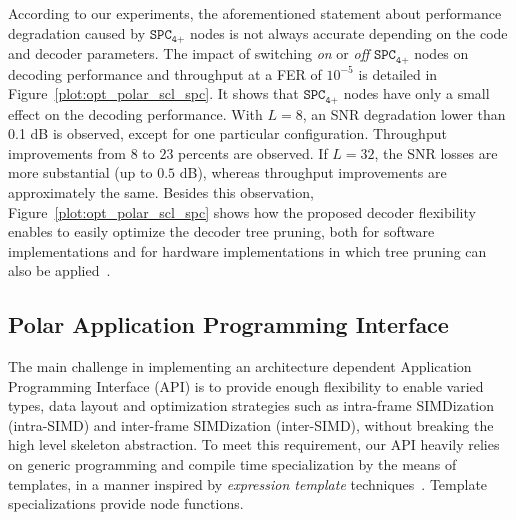 According to our experiments, the aforementioned statement about performance
degradation caused by $\texttt{SPC}_\texttt{4+}$ nodes is not always accurate
depending on the code and decoder parameters. The impact of switching
\textit{on} or \textit{off} $\texttt{SPC}_\texttt{4+}$ nodes on decoding
performance and throughput at a FER of $10^{-5}$ is detailed in
Figure~\ref{plot:opt_polar_scl_spc}. It shows that $\texttt{SPC}_\texttt{4+}$
nodes have only a small effect on the decoding performance. With $L=8$, an SNR
degradation lower than 0.1 dB is observed, except for one particular
configuration. Throughput improvements from $8$ to $23$ percents are observed.
If $L=32$, the SNR losses are more substantial (up to $0.5$ dB), whereas
throughput improvements are approximately the same. Besides this observation,
Figure~\ref{plot:opt_polar_scl_spc} shows how the proposed decoder flexibility
enables to easily optimize the decoder tree pruning, both for software
implementations and for hardware implementations in which tree pruning can also
be applied~\cite{Lin2014}.

\subsection{Polar Application Programming Interface}
\label{sec:opt_polar_api}

The main challenge in implementing an architecture dependent Application
Programming Interface (API) is to provide enough flexibility to enable varied
types, data layout and optimization strategies such as intra-frame SIMDization
(intra-SIMD) and inter-frame SIMDization (inter-SIMD), without breaking the high
level skeleton abstraction. To meet this requirement, our API heavily relies on
generic programming and compile time specialization by the means of \Cxx
templates, in a manner inspired by \emph{expression template}
techniques~\cite{Stroustrup2013}. Template specializations provide node
functions.

